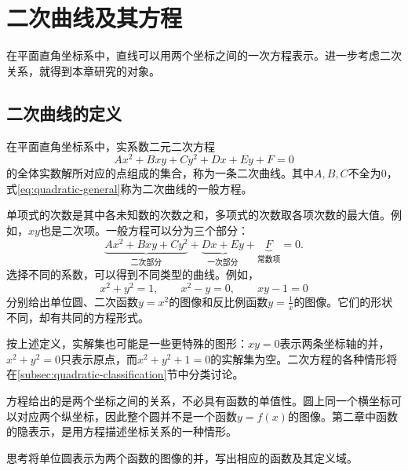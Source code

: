 \section{二次曲线及其方程}
\label{sec:quadratic-equations}

在平面直角坐标系中，直线可以用两个坐标之间的一次方程表示。进一步考虑二次关系，就得到本章研究的对象。

\subsection{二次曲线的定义}
\label{subsec:quadratic-definition}

\begin{definition}\label{def:quadratic-curve}
在平面直角坐标系中，实系数二元二次方程
\begin{equation}\label{eq:quadratic-general}
    A x^{2} + B x y + C y^{2} + D x + E y + F = 0
\end{equation}
的全体实数解所对应的点组成的集合，称为一条{\heiti{}二次曲线}。其中\(A , B , C\)不全为\(0\)，式\eqref{eq:quadratic-general}称为二次曲线的一般方程。
\end{definition}

单项式的次数是其中各未知数的次数之和，多项式的次数取各项次数的最大值。例如，\(x y\)也是二次项。一般方程可以分为三个部分：
\begin{equation}
    \underbrace{A x^{2} + B x y + C y^{2}}_{\text{二次部分}}
    + \underbrace{D x + E y}_{\text{一次部分}}
    + \underbrace{F}_{\text{常数项}} = 0 .
\end{equation}
选择不同的系数，可以得到不同类型的曲线。例如，
\begin{equation}
    x^{2} + y^{2} = 1 , \qquad x^{2} - y = 0 , \qquad x y - 1 = 0
\end{equation}
分别给出单位圆、二次函数\(y = x^{2}\)的图像和反比例函数\(y = \frac{1}{x}\)的图像。它们的形状不同，却有共同的方程形式。

按上述定义，实解集也可能是一些更特殊的图形：\(x y = 0\)表示两条坐标轴的并，\(x^{2} + y^{2} = 0\)只表示原点，而\(x^{2} + y^{2} + 1 = 0\)的实解集为空。二次方程的各种情形将在\ref{subsec:quadratic-classification}节中分类讨论。

方程给出的是两个坐标之间的关系，不必具有函数的单值性。圆上同一个横坐标可以对应两个纵坐标，因此整个圆并不是一个函数\(y = f(x)\)的图像。第二章中函数的隐表示，是用方程描述坐标关系的一种情形。

{\kaiti{}思考\quad 将单位圆表示为两个函数的图像的并，写出相应的函数及其定义域。}


